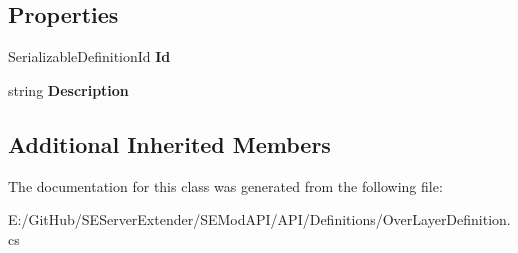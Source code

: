 \subsection*{Properties}
\begin{DoxyCompactItemize}
\item 
\hypertarget{class_s_e_mod_a_p_i_1_1_a_p_i_1_1_definitions_1_1_object_over_layer_definition_a370f7b97a7b3b9b271d05dfd96915df1}{}Serializable\+Definition\+Id {\bfseries Id}\label{class_s_e_mod_a_p_i_1_1_a_p_i_1_1_definitions_1_1_object_over_layer_definition_a370f7b97a7b3b9b271d05dfd96915df1}

\item 
\hypertarget{class_s_e_mod_a_p_i_1_1_a_p_i_1_1_definitions_1_1_object_over_layer_definition_ad1b77207c17f49b0599859724a1b7801}{}string {\bfseries Description}\label{class_s_e_mod_a_p_i_1_1_a_p_i_1_1_definitions_1_1_object_over_layer_definition_ad1b77207c17f49b0599859724a1b7801}

\end{DoxyCompactItemize}
\subsection*{Additional Inherited Members}


The documentation for this class was generated from the following file\+:\begin{DoxyCompactItemize}
\item 
E\+:/\+Git\+Hub/\+S\+E\+Server\+Extender/\+S\+E\+Mod\+A\+P\+I/\+A\+P\+I/\+Definitions/Over\+Layer\+Definition.\+cs\end{DoxyCompactItemize}
